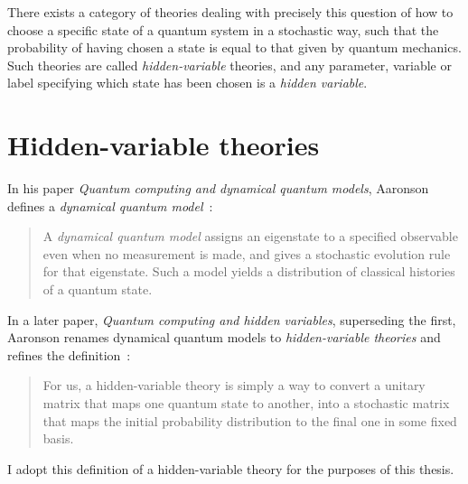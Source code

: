 There exists a category of theories dealing with precisely this question of how to choose a specific state of a quantum system in a stochastic way, such that the probability of having chosen a state is equal to that given by quantum mechanics. Such theories are called \emph{hidden-variable} theories, and any parameter, variable or label specifying which state has been chosen is a \emph{hidden variable}.

\section{Hidden-variable theories}\label{sec:hidden_variable_theories}

In his paper \emph{Quantum computing and dynamical quantum models}, Aaronson defines a \emph{dynamical quantum model}~\cite{aaronson_quantum_2002}:

\begin{quote}
A \emph{dynamical quantum model} assigns an eigenstate to a specified observable even when no measurement is made, and gives a stochastic evolution rule for that eigenstate. Such a model yields a distribution of classical histories of a quantum state.
\end{quote}
In a later paper, \emph{Quantum computing and hidden variables}, superseding the first, Aaronson renames dynamical quantum models to \emph{hidden-variable theories} and refines the definition~\cite{PhysRevA.71.032325}:
\begin{quote}
For us, a hidden-variable theory is simply a way to convert a unitary matrix that maps one quantum state to another, into a stochastic matrix that maps the initial probability distribution to the final one in some fixed basis.
\end{quote}
I adopt this definition of a hidden-variable theory for the purposes of this thesis.

